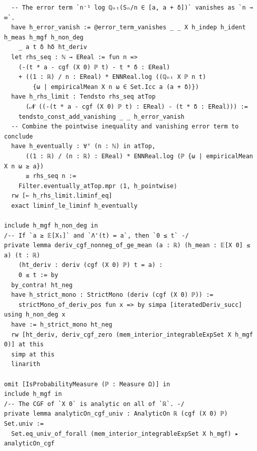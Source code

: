 \newpage
\begin{lstlisting}
  -- The error term `n⁻¹ log ℚₙₜ(Sₙ/n ∈ [a, a + δ])` vanishes as `n → ∞`.
  have h_error_vanish := @error_term_vanishes _ _ X h_indep h_ident h_meas h_mgf h_non_deg
    _ a t δ hδ ht_deriv
  let rhs_seq : ℕ → EReal := fun n =>
    (-(t * a - cgf (X 0) ℙ t) - t * δ : EReal)
    + ((1 : ℝ) / n : EReal) * ENNReal.log ((ℚₙₜ X ℙ n t)
        {ω | empiricalMean X n ω ∈ Set.Icc a (a + δ)})
  have h_rhs_limit : Tendsto rhs_seq atTop
      (𝓝 ((-(t * a - cgf (X 0) ℙ t) : EReal) - (t * δ : EReal))) :=
    tendsto_const_add_vanishing _ _ h_error_vanish
  -- Combine the pointwise inequality and vanishing error term to conclude
  have h_eventually : ∀ᶠ (n : ℕ) in atTop,
      ((1 : ℝ) / (n : ℝ) : EReal) * ENNReal.log (ℙ {ω | empiricalMean X n ω ≥ a})
      ≥ rhs_seq n :=
    Filter.eventually_atTop.mpr ⟨1, h_pointwise⟩
  rw [← h_rhs_limit.liminf_eq]
  exact liminf_le_liminf h_eventually

include h_mgf h_non_deg in
/-- If `a ≥ 𝔼[X₁]` and `Λ'(t) = a`, then `0 ≤ t` -/
private lemma deriv_cgf_nonneg_of_ge_mean (a : ℝ) (h_mean : 𝔼[X 0] ≤ a) (t : ℝ)
    (ht_deriv : deriv (cgf (X 0) ℙ) t = a) :
    0 ≤ t := by
  by_contra! ht_neg
  have h_strict_mono : StrictMono (deriv (cgf (X 0) ℙ)) :=
    strictMono_of_deriv_pos fun x => by simpa [iteratedDeriv_succ] using h_non_deg x
  have := h_strict_mono ht_neg
  rw [ht_deriv, deriv_cgf_zero (mem_interior_integrableExpSet X h_mgf 0)] at this
  simp at this
  linarith

omit [IsProbabilityMeasure (ℙ : Measure Ω)] in
include h_mgf in
/-- The CGF of `X 0` is analytic on all of `ℝ`. -/
private lemma analyticOn_cgf_univ : AnalyticOn ℝ (cgf (X 0) ℙ) Set.univ :=
  Set.eq_univ_of_forall (mem_interior_integrableExpSet X h_mgf) ▸ analyticOn_cgf
\end{lstlisting}
\newpage
